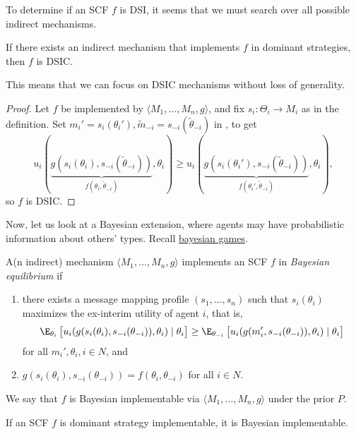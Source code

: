 To determine if an SCF $f$ is DSI, it seems that we must search over all possible indirect mechanisms.

\begin{ftheo}
	If there exists an indirect mechanism that implements $f$ in dominant strategies, then $f$ is DSIC.
\end{ftheo}
This means that we can focus on DSIC mechanisms without loss of generality.
\begin{proof}
	Let $f$ be implemented by $\langle M_1,\ldots,M_n,g\rangle$, and fix $s_i : \Theta_i \to M_i$ as in the definition. Set $m_i' = s_i(\theta_i'), \widetilde{m}_{-i} = s_{-i}(\widetilde{\theta}_{-i})$ in , to get
	\[ u_i(\underbrace{g(s_i(\theta_i),s_{-i}(\widetilde{\theta}_{-i}))}_{f(\theta_i,\widetilde\theta_{-i})},\theta_i) \ge u_i(\underbrace{g(s_i(\theta_i'),s_{-i}(\widetilde\theta_{-i}))}_{f(\theta_i',\widetilde\theta_{-i})},\theta_i), \]
	so $f$ is DSIC.
\end{proof}

Now, let us look at a Bayesian extension, where agents may have probabilistic information about others' types. Recall \hyperref[def: bayesian game]{bayesian games}.\\

\begin{fdef}
	A(n indirect) mechanism $\langle M_1,\ldots,M_n,g\rangle$ implements an SCF $f$ in \emph{Bayesian equilibrium} if
	\begin{enumerate}
		\item there exists a message mapping profile $(s_1,\ldots,s_n)$ such that $s_i(\theta_i)$ maximizes the ex-interim utility of agent $i$, that is,
		\[ \E_{\theta_i} \left[ u_i(g(s_i(\theta_i),s_{-i}(\theta_{-i})),\theta_i) \mid \theta_i \right] \ge \E_{\theta_{-i}} \left[ u_i(g(m_i',s_{-i}(\theta_{-i})),\theta_i) \mid \theta_i \right] \]
		for all $m_i',\theta_i,i\in N$, and
		\item $g(s_i(\theta_i),s_{-i}(\theta_{-i})) = f(\theta_i,\theta_{-i})$ for all $i \in N$.
	\end{enumerate}	
	We say that $f$ is Bayesian implementable via $\langle M_1,\ldots,M_n,g\rangle$ under the prior $P$.
\end{fdef}

\begin{fprop}
	If an SCF $f$ is dominant strategy implementable, it is Bayesian implementable.
\end{fprop}


